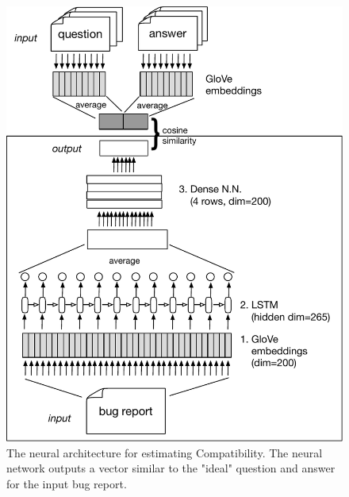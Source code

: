 \begin{figure}[t]
\centering
\includegraphics[width=0.99\linewidth]{figures/compat_nn.pdf}
\caption{The neural architecture for estimating Compatibility. The neural network outputs a vector similar
to the "ideal" question and answer for the input bug report.}
\label{fig:compat_nn}
\end{figure}


